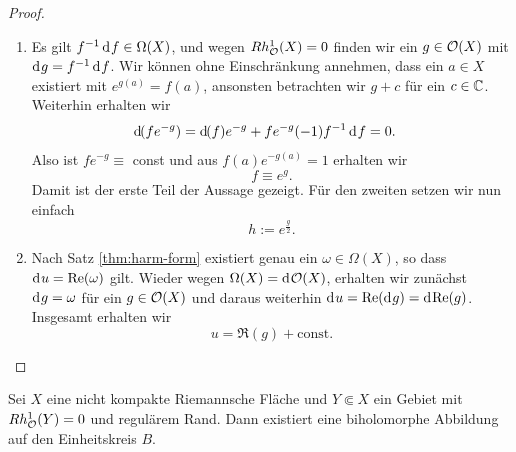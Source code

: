 \begin{proof}
  \begin{enumerate}
  \item Es gilt $f^{-1}\d[f] \in \Omega(X)$, und wegen $Rh^1_{\mathcal{O}}(X) = 0$
    finden wir ein $g \in \mathcal{O}(X)$ mit $\d[g] = f^{-1} \d[f]$. 
    Wir können ohne Einschränkung annehmen, dass ein $a \in X$ existiert mit $ e^{g(a)} =
    f(a)$, ansonsten betrachten wir $g + c$ für ein $c \in \mathbb{C}$. Weiterhin erhalten wir
    \begin{align*}
      \d[(f e^{-g})] & = \d[(f)] e^{-g} + f e^{-g} (-1) f^{-1}\d[f] = 0.
    \end{align*}
    Also ist $fe^{-g} \equiv $ const und aus $f(a) e^{-g(a)} = 1$
    erhalten wir
    \[
    f \equiv e^g.
    \]
    Damit ist der erste Teil der Aussage gezeigt. Für den zweiten
    setzen wir nun einfach
    \[
    h := e^{\frac{g}{2}}.
    \]
  \item Nach Satz \ref{thm:harm-form} existiert genau ein $\omega \in \Omega(X)$, so dass $\d[u]
    = \Re(\omega)$
    gilt. Wieder wegen $\Omega(X) = \d[\hol(X)]$,
    erhalten wir zunächst $\d[g] = \omega$ für ein $g \in \mathcal{O}(X)$ und
    daraus weiterhin $\d[u] = \Re(\d[g])= \d[\Re(g)]$. Insgesamt erhalten wir
    \[
    u = \Re(g) + \text{const.}
    \]
  \end{enumerate}
\end{proof}

\begin{thm}
  \label{thm:Gebiet-Kreis}
  Sei $X$ eine nicht kompakte Riemannsche Fläche und $Y \Subset X$ ein
  Gebiet mit $Rh^1_{\mathcal{O}}(Y) = 0$ und regulärem Rand.
  Dann existiert eine biholomorphe Abbildung auf den Einheitskreis $B$.
\end{thm}

